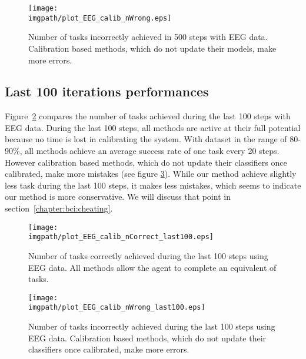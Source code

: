 \begin{figure}[!htbp]
\centering
\texttt{[image: \\imgpath/plot\_EEG\_calib\_nWrong.eps]}
\caption{Number of tasks incorrectly achieved in 500 steps with EEG data. Calibration based methods, which do not update their models, make more errors.}
\label{fig:nWrongEEG}
\end{figure}

\subsection{Last 100 iterations performances}

Figure~\ref{fig:nCorrectEEG_last100} compares the number of tasks achieved during the last 100 steps with EEG data. During the last 100 steps, all methods are active at their full potential because no time is lost in calibrating the system. With dataset in the range of 80-90\%, all methods achieve an average success rate of one task every 20 steps. However calibration based methods, which do not update their classifiers once calibrated, make more mistakes (see figure \ref{fig:nWrongEEG_last100}). While our method achieve slightly less task during the last 100 steps, it makes less mistakes, which seems to indicate our method is more conservative. We will discuss that point in section~\ref{chapter:bci:cheating}.

\begin{figure}[!htbp]
\centering
\texttt{[image: \\imgpath/plot\_EEG\_calib\_nCorrect\_last100.eps]}
\caption{Number of tasks correctly achieved during the last 100 steps using EEG data. All methods allow the agent to complete an equivalent of tasks.}
\label{fig:nCorrectEEG_last100}
\end{figure} 

\visuopti{\newpage}

\begin{figure}[!htbp]
\centering
\texttt{[image: \\imgpath/plot\_EEG\_calib\_nWrong\_last100.eps]}
\caption{Number of tasks incorrectly achieved during the last 100 steps using EEG data. Calibration based methods, which do not update their classifiers once calibrated, make more errors.}
\label{fig:nWrongEEG_last100}
\end{figure} 


